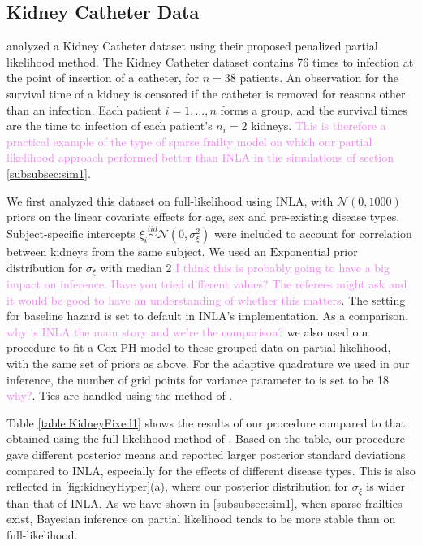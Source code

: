 \documentclass[ba]{imsart}
\newcommand{\alex}[1]{\textcolor{violet}{{ }#1}}
\begin{document}
\subsection{Kidney Catheter Data}\label{subsec:kidney}

\cite{freqPL} analyzed a Kidney Catheter dataset using their proposed penalized partial likelihood method. The Kidney Catheter dataset contains 76 times to infection at the point of insertion of a catheter, for $n = 38$ patients. An observation for the survival time of a kidney is censored if the catheter is removed for reasons other than an infection.  Each patient $i=1,\ldots,n$ forms a group, and the survival times are the time to infection of each patient's $n_{i} = 2$ kidneys. \alex{This is therefore a practical example of the type of sparse frailty model on which our partial likelihood approach performed better than INLA in the simulations of section \ref{subsubsec:sim1}}.

We first analyzed this dataset on full-likelihood using INLA, with $\mathcal{N}(0, 1000)$ priors on the linear covariate effects for age, sex and pre-existing disease types. Subject-specific intercepts $\xi_{i}\overset{iid}{\sim}\mathcal{N}(0,\sigma^{2}_{\xi})$ were included to account for correlation between kidneys from the same subject. We used an $\text{Exponential}$ prior distribution for $\sigma_{\xi}$ with median 2\alex{I think this is probably going to have a big impact on inference. Have you tried different values? The referees might ask and it would be good to have an understanding of whether this matters}. The setting for baseline hazard is set to default in INLA's implementation. As a comparison,\alex{why is INLA the main story and we're the comparison?} we also used our procedure to fit a Cox PH model to these grouped data on partial likelihood, with the same set of priors as above. For the adaptive quadrature we used in our inference, the number of grid points for variance parameter to is set to be 18\alex{why?}. Ties are handled using the method of \cite{Breslow}.

Table \ref{table:KidneyFixed1} shows the results of our procedure compared to that obtained using the full likelihood method of \cite{inlacoxph}. Based on the table, our procedure gave different posterior means and reported larger posterior standard deviations compared to INLA, especially for the effects of different disease types. This is also reflected in \ref{fig:kidneyHyper}(a), where our posterior distribution for $\sigma_{\xi}$ is wider than that of INLA. As we have shown in \ref{subsubsec:sim1}, when sparse frailties exist, Bayesian inference on partial likelihood tends to be more stable than on full-likelihood.
\end{document}
